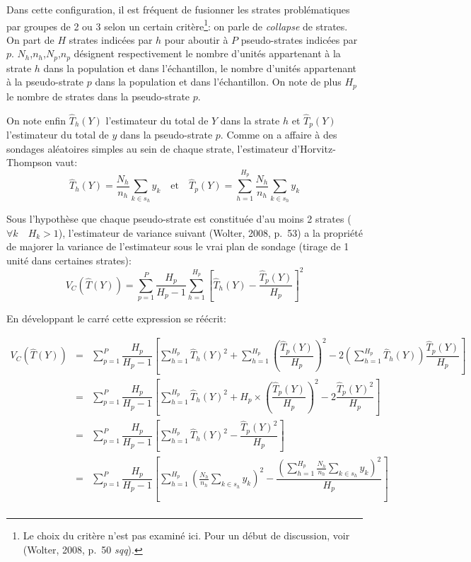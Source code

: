 \documentclass[a4paper,12pt]{article}
\begin{document}
\bigskip Dans cette configuration, il est fréquent de fusionner les strates problématiques par groupes de 2 ou 3 selon un certain critère\footnote{Le choix du critère n'est pas examiné ici. Pour un début de discussion, voir (Wolter, 2008, p.~50 \textit{sqq}).}: on parle de \textit{collapse} de strates. On part de $H$ strates indicées par $h$ pour aboutir à $P$ pseudo-strates indicées par $p$. $N_h$,$n_h$,$N_p$,$n_p$ désignent respectivement le nombre d'unités appartenant à la strate $h$ dans la population et dans l'échantillon, le nombre d'unités appartenant à la pseudo-strate $p$ dans la population et dans l'échantillon. On note de plus $H_p$ le nombre de strates dans la pseudo-strate $p$. 

\bigskip On note enfin $\hat{T}_h(Y)$ l'estimateur du total de $Y$ dans la strate $h$ et $\hat{T}_p(Y)$ l'estimateur du total de $y$ dans la pseudo-strate $p$. Comme on a affaire à des sondages aléatoires simples au sein de chaque strate, l'estimateur d'Horvitz-Thompson vaut: $$ \hat{T}_h(Y) = \frac{N_h}{n_h} \sum_{k \in s_h} y_k \quad \text{et} \quad \hat{T}_p(Y) = \sum_{h = 1}^{H_p} \frac{N_h}{n_h} \sum_{k \in s_h} y_k $$

\bigskip Sous l'hypothèse que chaque pseudo-strate est constituée d'au moins 2 strates ($\forall k \quad H_k > 1$), l'estimateur de variance suivant (Wolter, 2008, p.~53) a la propriété de majorer la variance de l'estimateur sous le vrai plan de sondage (tirage de 1 unité dans certaines strates): $$ V_C(\hat{T}(Y)) = \sum_{p = 1}^{P} \dfrac{H_p}{H_p - 1} \sum_{h = 1}^{H_p} \left[\hat{T}_h(Y) - \dfrac{\hat{T}_p(Y)}{H_p} \right]^2$$

\bigskip En développant le carré cette expression se réécrit:

\begin{eqnarray*}
V_C(\hat{T}(Y)) &=& \sum_{p = 1}^{P} \dfrac{H_p}{H_p - 1} \left[ \sum_{h = 1}^{H_p} \hat{T}_h(Y)^2 +\sum_{h = 1}^{H_p} \left(\dfrac{\hat{T}_p(Y)}{H_p}\right)^2 - 2\left(\sum_{h = 1}^{H_p} \hat{T}_h(Y)\right) \dfrac{\hat{T}_p(Y)}{H_p}\right] \\
&=& \sum_{p = 1}^{P} \dfrac{H_p}{H_p - 1} \left[ \sum_{h = 1}^{H_p} \hat{T}_h(Y)^2 + H_p\times \left(\dfrac{\hat{T}_p(Y)}{H_p}\right)^2 - 2 \dfrac{\hat{T}_p(Y)^2}{H_p}\right] \\
&=& \sum_{p = 1}^{P} \dfrac{H_p}{H_p - 1} \left[ \sum_{h = 1}^{H_p} \hat{T}_h(Y)^2 - \dfrac{\hat{T}_p(Y)^2}{H_p}\right] \\
&=& \sum_{p = 1}^{P} \dfrac{H_p}{H_p - 1} \left[ \sum_{h = 1}^{H_p} \left(\frac{N_h}{n_h} \sum_{k \in s_h} y_k\right)^2 - \dfrac{\left(\sum_{h = 1}^{H_p} \frac{N_h}{n_h} \sum_{k \in s_h} y_k \right)^2}{H_p}\right] \\
\end{eqnarray*}
\end{document}
